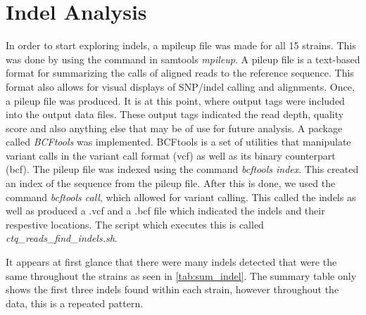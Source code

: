 \documentclass[12pt]{article}
\begin{document}
\section{Indel Analysis}
\vspace{-0.5cm}
In order to start exploring indels, a mpileup file was made for all 15 strains. This was done by using the command in samtools \textit{mpileup}. A pileup file is a text-based format for summarizing the calls of aligned reads to the reference sequence. This format also allows for visual displays of SNP/indel calling and alignments. Once, a pileup file was produced. It is at this point, where output tags were included into the output data files. These output tags indicated the read depth, quality score and also anything else that may be of use for future analysis.  A package called \textit{BCFtools} was implemented. BCFtools is a set of utilities that manipulate variant calls in the variant call format (vcf) as well as its binary counterpart (bcf). The pileup file was indexed using the command \textit{bcftools index}. This created an index of the sequence from the pileup file. After this is done, we used the command \textit{bcftools call}, which allowed for variant calling. This called the indels as well as produced a .vcf and a .bcf file which indicated the indels and their respestive locations. The script which executes this is called \textit{ctq\_reads\_find\_indels.sh}. 

It appears at first glance that there were many indels detected that were the same throughout the strains as seen in \ref{tab:sum_indel}. The summary table only shows the first three indels found within each strain, however throughout the data, this is a repeated pattern. 
\end{document}
